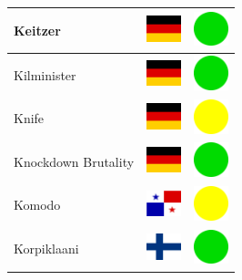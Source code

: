 \documentclass[12pt, a4paper, twoside]{report}
\begin{document}
\begin{center}
\begin{longtable}{|p{5cm}|p{2cm}|p{2cm}|}
Keitzer & \includegraphics[width=1cm]{4x3/de} & \includegraphics[width=1cm]{likes/y} \\ \hline
Kilminister & \includegraphics[width=1cm]{4x3/de} & \includegraphics[width=1cm]{likes/y} \\ \hline
Knife & \includegraphics[width=1cm]{4x3/de} & \includegraphics[width=1cm]{likes/m} \\ \hline
Knockdown Brutality & \includegraphics[width=1cm]{4x3/de} & \includegraphics[width=1cm]{likes/y} \\ \hline
Komodo & \includegraphics[width=1cm]{4x3/pa} & \includegraphics[width=1cm]{likes/m} \\ \hline
Korpiklaani & \includegraphics[width=1cm]{4x3/fi} & \includegraphics[width=1cm]{likes/y} \\ \hline

\end{longtable}
\end{center}
\end{document}

